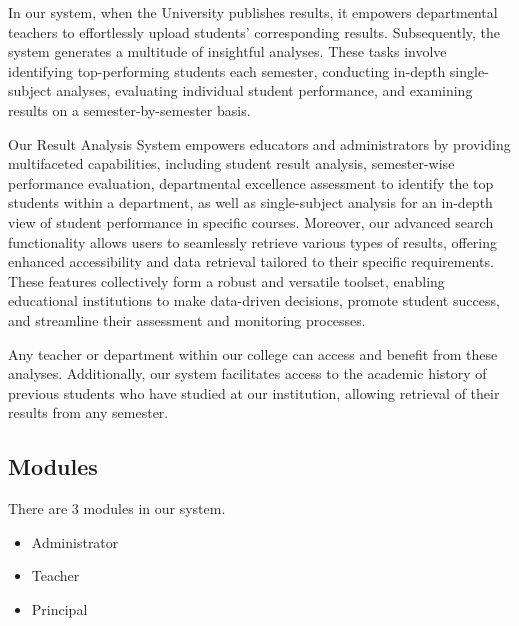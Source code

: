\documentclass{nascproject}
\begin{document}
In our system, when the University publishes results, it empowers departmental teachers to effortlessly upload students' corresponding results. Subsequently, the system generates a multitude of insightful analyses. These tasks involve identifying top-performing students each semester, conducting in-depth single-subject analyses, evaluating individual student performance, and examining results on a semester-by-semester basis.

Our Result Analysis System empowers educators and administrators by providing multifaceted capabilities, including student result analysis, semester-wise performance evaluation, departmental excellence assessment to identify the top students within a department, as well as single-subject analysis for an in-depth view of student performance in specific courses. Moreover, our advanced search functionality allows users to seamlessly retrieve various types of results, offering enhanced accessibility and data retrieval tailored to their specific requirements. These features collectively form a robust and versatile toolset, enabling educational institutions to make data-driven decisions, promote student success, and streamline their assessment and monitoring processes.

Any teacher or department within our college can access and benefit from these analyses. Additionally, our system facilitates access to the academic history of previous students who have studied at our institution, allowing retrieval of their results from any semester.
\subsection{Modules}
	There are 3 modules in our system.
  \begin{itemize}
  	\item Administrator
  	\item Teacher
  	\item Principal
  \end{itemize}
\end{document}
